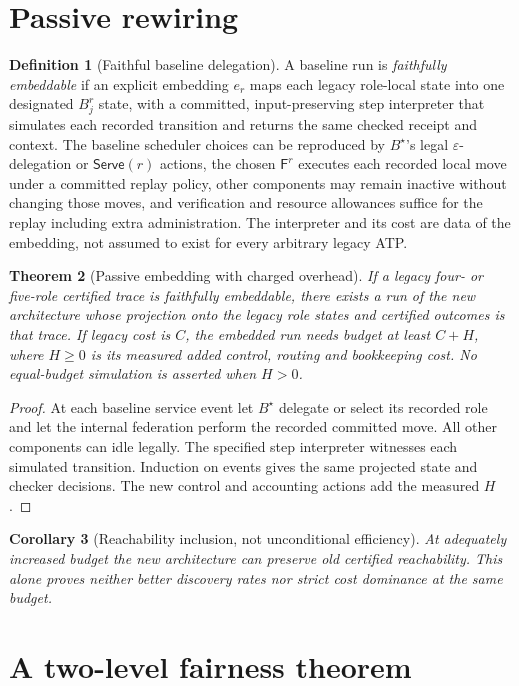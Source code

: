 \documentclass[11pt,letterpaper,oneside]{book}
\newtheorem{theorem}{Theorem}[chapter]
\newtheorem{corollary}[theorem]{Corollary}
\theoremstyle{definition}
\newtheorem{definition}[theorem]{Definition}
\theoremstyle{remark}
\newcommand{\F}{\mathsf F}
\newcommand{\Serve}{\mathsf{Serve}}
\begin{document}
\section{Passive rewiring}
\begin{definition}[Faithful baseline delegation]
A baseline run is \emph{faithfully embeddable} if an explicit
embedding $e_r$ maps each legacy role-local state into one designated
$B_j^r$ state, with a committed, input-preserving step interpreter
that simulates each recorded transition and returns the same checked
receipt and context. The baseline scheduler choices
can be reproduced by $B^\star$'s legal $\varepsilon$-delegation or
$\Serve(r)$ actions, the chosen $\F^r$ executes each recorded local
move under a committed replay policy, other components may remain
inactive without changing those moves, and verification and resource
allowances suffice for the replay including extra administration.
The interpreter and its cost are data of the embedding, not assumed
to exist for every arbitrary legacy ATP.
\end{definition}
\begin{theorem}[Passive embedding with charged overhead]\label{thm:embedding}
If a legacy four- or five-role certified trace is faithfully
embeddable, there exists a run of the new architecture whose projection
onto the legacy role states and certified outcomes is that trace.
If legacy cost is $C$, the embedded run needs budget at least
$C+H$, where $H\ge0$ is its measured added control, routing and
bookkeeping cost. No equal-budget simulation is asserted when $H>0$.
\end{theorem}
\begin{proof}
At each baseline service event let $B^\star$ delegate or select its
recorded role and let the internal federation perform the recorded
committed move. All other components can idle legally. The specified step interpreter
witnesses each simulated transition. Induction on events gives the same
projected state and checker decisions. The new
control and accounting actions add the measured $H$.\end{proof}
\begin{corollary}[Reachability inclusion, not unconditional efficiency]
At adequately increased budget the new architecture can preserve old
certified reachability. This alone proves neither better discovery
rates nor strict cost dominance at the same budget.\end{corollary}

\section{A two-level fairness theorem}
\end{document}
